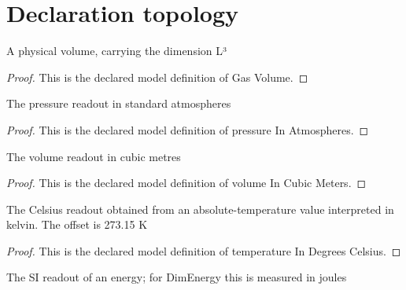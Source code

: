\section{Declaration topology}
\begin{definition}
  \label{def:physics:phyx-mini-0339:phyxminiproblems-problemphyxmini0339-gasvolume}
  A physical volume, carrying the dimension L³
\end{definition}
\begin{proof}
  This is the declared model definition of Gas Volume.
\end{proof}
\begin{definition}
  \label{def:physics:phyx-mini-0339:phyxminiproblems-problemphyxmini0339-pressureinatmospheres}
  The pressure readout in standard atmospheres
\end{definition}
\begin{proof}
  This is the declared model definition of pressure In Atmospheres.
\end{proof}
\begin{definition}
  \label{def:physics:phyx-mini-0339:phyxminiproblems-problemphyxmini0339-volumeincubicmeters}
  The volume readout in cubic metres
\end{definition}
\begin{proof}
  This is the declared model definition of volume In Cubic Meters.
\end{proof}
\begin{definition}
  \label{def:physics:phyx-mini-0339:phyxminiproblems-problemphyxmini0339-temperatureindegreescelsius}
  The Celsius readout obtained from an absolute-temperature value interpreted in kelvin. The offset is 273.15 K
\end{definition}
\begin{proof}
  This is the declared model definition of temperature In Degrees Celsius.
\end{proof}
\begin{definition}
  \label{def:physics:phyx-mini-0339:phyxminiproblems-problemphyxmini0339-energyinjoules}
  The SI readout of an energy; for DimEnergy this is measured in joules
\end{definition}
